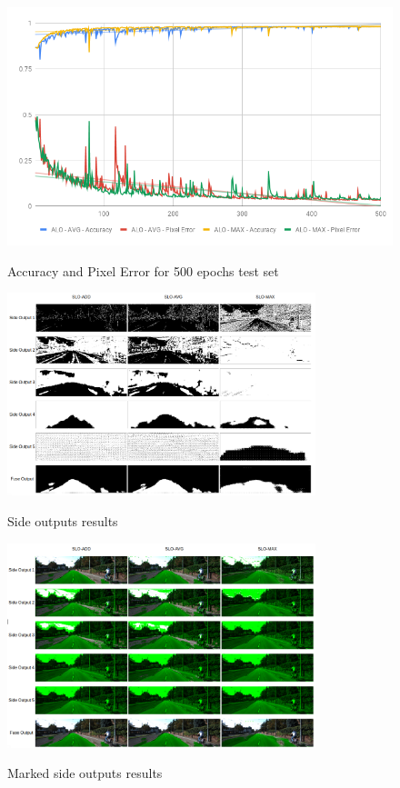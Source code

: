 \begin{figure}
  \caption{Accuracy and Pixel Error for 500 epochs test set}
  \centering
  \includegraphics[width=1.\columnwidth]{figures/falreis/val_acc_500_epochs.png}\label{fig:val_acc_500_epochs}
\end{figure}

\begin{figure}
  \caption{Side outputs results}
  \centering
  \includegraphics[width=0.8\textwidth]{figures/falreis/side_outputs.png}
  \label{fig:side_outputs}
\end{figure}

\begin{figure}
  \caption{Marked side outputs results}
  \centering
  \includegraphics[width=0.8\textwidth]{figures/falreis/side_outputs_mark.png}
  \label{fig:side_outputs_mark}
\end{figure}



